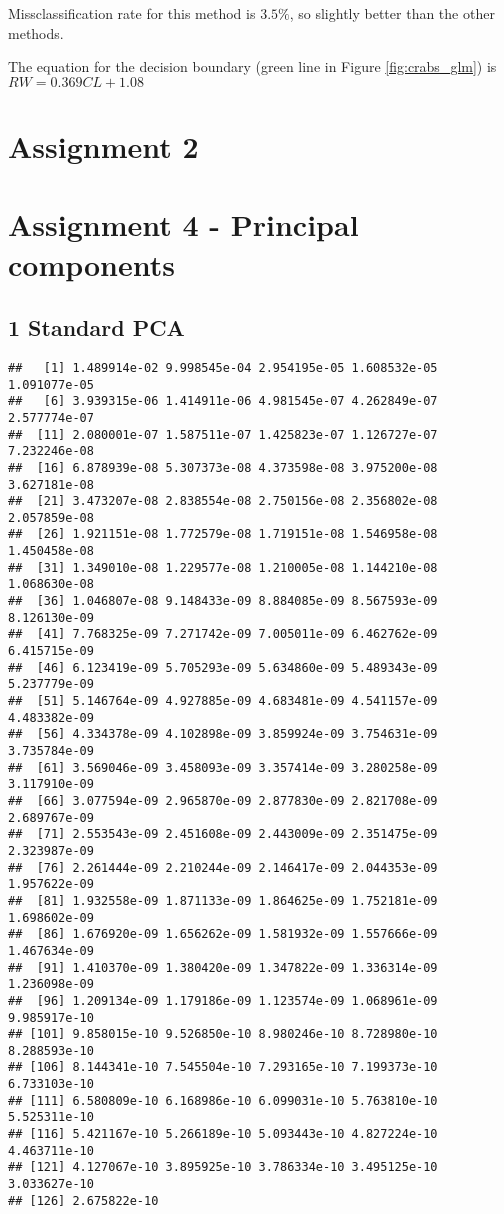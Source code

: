 \documentclass[]{article}
\begin{document}
Missclassification rate for this method is \(3.5\%\), so slightly better
than the other methods.

The equation for the decision boundary (green line in Figure
\ref{fig:crabs_glm}) is \(RW = 0.369 CL + 1.08\)

\section{Assignment 2}\label{assignment-2}

\section{Assignment 4 - Principal
components}\label{assignment-4---principal-components}

\subsection{1 Standard PCA}\label{standard-pca}

\begin{verbatim}
##   [1] 1.489914e-02 9.998545e-04 2.954195e-05 1.608532e-05 1.091077e-05
##   [6] 3.939315e-06 1.414911e-06 4.981545e-07 4.262849e-07 2.577774e-07
##  [11] 2.080001e-07 1.587511e-07 1.425823e-07 1.126727e-07 7.232246e-08
##  [16] 6.878939e-08 5.307373e-08 4.373598e-08 3.975200e-08 3.627181e-08
##  [21] 3.473207e-08 2.838554e-08 2.750156e-08 2.356802e-08 2.057859e-08
##  [26] 1.921151e-08 1.772579e-08 1.719151e-08 1.546958e-08 1.450458e-08
##  [31] 1.349010e-08 1.229577e-08 1.210005e-08 1.144210e-08 1.068630e-08
##  [36] 1.046807e-08 9.148433e-09 8.884085e-09 8.567593e-09 8.126130e-09
##  [41] 7.768325e-09 7.271742e-09 7.005011e-09 6.462762e-09 6.415715e-09
##  [46] 6.123419e-09 5.705293e-09 5.634860e-09 5.489343e-09 5.237779e-09
##  [51] 5.146764e-09 4.927885e-09 4.683481e-09 4.541157e-09 4.483382e-09
##  [56] 4.334378e-09 4.102898e-09 3.859924e-09 3.754631e-09 3.735784e-09
##  [61] 3.569046e-09 3.458093e-09 3.357414e-09 3.280258e-09 3.117910e-09
##  [66] 3.077594e-09 2.965870e-09 2.877830e-09 2.821708e-09 2.689767e-09
##  [71] 2.553543e-09 2.451608e-09 2.443009e-09 2.351475e-09 2.323987e-09
##  [76] 2.261444e-09 2.210244e-09 2.146417e-09 2.044353e-09 1.957622e-09
##  [81] 1.932558e-09 1.871133e-09 1.864625e-09 1.752181e-09 1.698602e-09
##  [86] 1.676920e-09 1.656262e-09 1.581932e-09 1.557666e-09 1.467634e-09
##  [91] 1.410370e-09 1.380420e-09 1.347822e-09 1.336314e-09 1.236098e-09
##  [96] 1.209134e-09 1.179186e-09 1.123574e-09 1.068961e-09 9.985917e-10
## [101] 9.858015e-10 9.526850e-10 8.980246e-10 8.728980e-10 8.288593e-10
## [106] 8.144341e-10 7.545504e-10 7.293165e-10 7.199373e-10 6.733103e-10
## [111] 6.580809e-10 6.168986e-10 6.099031e-10 5.763810e-10 5.525311e-10
## [116] 5.421167e-10 5.266189e-10 5.093443e-10 4.827224e-10 4.463711e-10
## [121] 4.127067e-10 3.895925e-10 3.786334e-10 3.495125e-10 3.033627e-10
## [126] 2.675822e-10
\end{verbatim}
\end{document}
